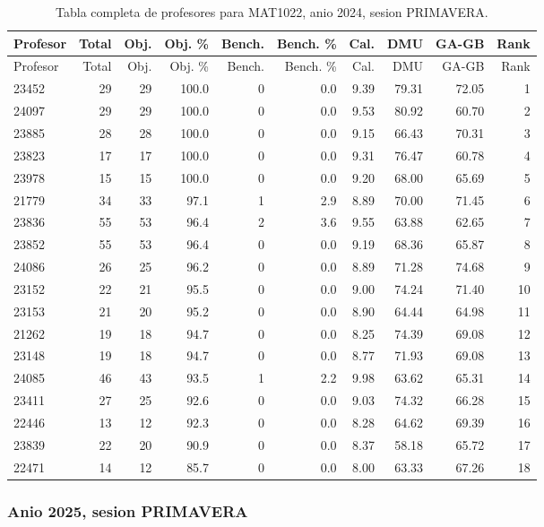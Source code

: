 \begingroup
\scriptsize
\setlength{\tabcolsep}{3pt}
\begin{longtable}{lrrrrrrrrr}
\caption{Tabla completa de profesores para MAT1022, anio 2024, sesion PRIMAVERA.}\label{tab:prof-period-mat1022-2024-primavera}\\
\toprule
Profesor & Total & Obj. & Obj. \% & Bench. & Bench. \% & Cal. & DMU & GA-GB & Rank \\
\midrule
\endfirsthead
\toprule
Profesor & Total & Obj. & Obj. \% & Bench. & Bench. \% & Cal. & DMU & GA-GB & Rank \\
\midrule
\endhead
23452 & 29 & 29 & 100.0 & 0 & 0.0 & 9.39 & 79.31 & 72.05 & 1 \\
24097 & 29 & 29 & 100.0 & 0 & 0.0 & 9.53 & 80.92 & 60.70 & 2 \\
23885 & 28 & 28 & 100.0 & 0 & 0.0 & 9.15 & 66.43 & 70.31 & 3 \\
23823 & 17 & 17 & 100.0 & 0 & 0.0 & 9.31 & 76.47 & 60.78 & 4 \\
23978 & 15 & 15 & 100.0 & 0 & 0.0 & 9.20 & 68.00 & 65.69 & 5 \\
21779 & 34 & 33 & 97.1 & 1 & 2.9 & 8.89 & 70.00 & 71.45 & 6 \\
23836 & 55 & 53 & 96.4 & 2 & 3.6 & 9.55 & 63.88 & 62.65 & 7 \\
23852 & 55 & 53 & 96.4 & 0 & 0.0 & 9.19 & 68.36 & 65.87 & 8 \\
24086 & 26 & 25 & 96.2 & 0 & 0.0 & 8.89 & 71.28 & 74.68 & 9 \\
23152 & 22 & 21 & 95.5 & 0 & 0.0 & 9.00 & 74.24 & 71.40 & 10 \\
23153 & 21 & 20 & 95.2 & 0 & 0.0 & 8.90 & 64.44 & 64.98 & 11 \\
21262 & 19 & 18 & 94.7 & 0 & 0.0 & 8.25 & 74.39 & 69.08 & 12 \\
23148 & 19 & 18 & 94.7 & 0 & 0.0 & 8.77 & 71.93 & 69.08 & 13 \\
24085 & 46 & 43 & 93.5 & 1 & 2.2 & 9.98 & 63.62 & 65.31 & 14 \\
23411 & 27 & 25 & 92.6 & 0 & 0.0 & 9.03 & 74.32 & 66.28 & 15 \\
22446 & 13 & 12 & 92.3 & 0 & 0.0 & 8.28 & 64.62 & 69.39 & 16 \\
23839 & 22 & 20 & 90.9 & 0 & 0.0 & 8.37 & 58.18 & 65.72 & 17 \\
22471 & 14 & 12 & 85.7 & 0 & 0.0 & 8.00 & 63.33 & 67.26 & 18 \\
\bottomrule
\end{longtable}
\endgroup

\subsubsection{Anio 2025, sesion PRIMAVERA}

